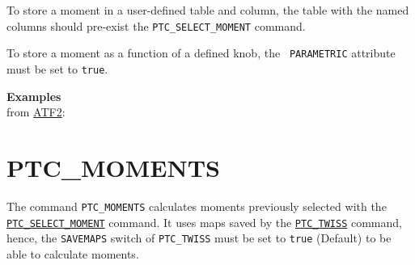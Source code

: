 To store a moment in a user-defined table and column, the table with the
named columns should pre-exist the {\tt PTC\_SELECT\_MOMENT} command.

To store a moment as a function of a defined knob, the {\tt
  PARAMETRIC} attribute must be set to {\tt true}.

{\bf Examples}\\
from
\href{http://cern.ch/frs/mad-X_examples/ptc_madx_interface/moments/moments.madx}{ATF2}:




 
% 


\section{PTC\_MOMENTS}
\label{sec:ptc_moments}

The command {\tt PTC\_MOMENTS} calculates moments previously selected with the
\hyperref[sec:ptc_select_moment]{\tt PTC\_SELECT\_MOMENT} command.  It uses maps
saved by the \hyperref[sec:ptc_twiss]{\tt PTC\_TWISS} command, hence,
the {\tt SAVEMAPS} switch of {\tt PTC\_TWISS} must be set to {\tt true}
(Default) to be able to calculate moments.

